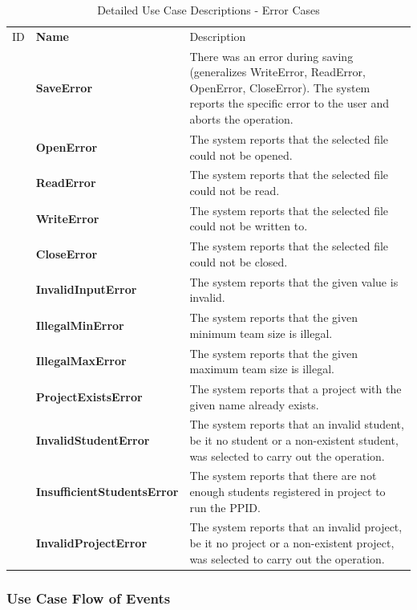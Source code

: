 \documentclass[12pt,letterpaper]{article}
\begin{document}
\begin{table}[H]
	\caption{Detailed Use Case Descriptions - Error Cases}
	\vspace{1em}
	\begin{tabu} to 
	    \tableheader{}ID & Name & Description\\
		\saveerror{} & SaveError & There was an error during saving (generalizes WriteError, ReadError, OpenError, CloseError). 
		The system reports the specific error to the user and aborts the operation.\\
		\openerror{} & OpenError & The system reports that the selected file could not be opened.\\
		\readerror{} & ReadError & The system reports that the selected file could not be read.\\
		\writeerror{} & WriteError & The system reports that the selected file could not be written to.\\
		\closeerror{} & CloseError & The system reports that the selected file could not be closed.\\
		\invalidinputerror{} & InvalidInputError & The system reports that the given value is invalid.\\
		\illegalminerror{} & IllegalMinError & The system reports that the given minimum team size is illegal.\\
		\illegalmaxerror{} & IllegalMaxError & The system reports that the given maximum team size is illegal.\\
		\projectexistserror{} & ProjectExistsError & The system reports that a project with the given name already exists.\\
		\invalidstudenterror{} & InvalidStudentError & The system reports that an invalid student, be it no student or a non-existent student, 
		was selected to carry out the operation.\\
		\insufficientstudentserror{} & InsufficientStudentsError & The system reports that there are not enough students registered in project to
		 run the PPID.\\
   		\invalidprojecterror{} & InvalidProjectError & The system reports that an invalid project, be it no project or a non-existent project, was selected to carry out the operation.\\
	\end{tabu}
\end{table}

\subsubsection*{Use Case Flow of Events}
\end{document}
